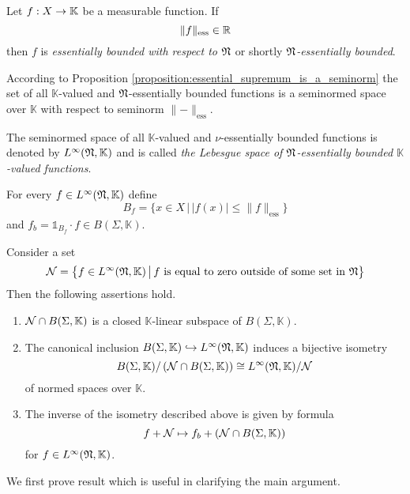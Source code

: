 \begin{definition}
    Let $f:X\rightarrow \mathbb{K}$ be a measurable function. If
    $$\lVert f \rVert_{\mathrm{ess}} \in {\mathbb R}$$
    then $f$ is \textit{essentially bounded with respect to ${\mathfrak N}$} or shortly \textit{${\mathfrak N}$-essentially bounded}.
\end{definition}
\noindent
According to Proposition \ref{proposition:essential_supremum_is_a_seminorm} the set of all $\mathbb{K}$-valued and ${\mathfrak N}$-essentially bounded functions is a seminormed space over $\mathbb{K}$ with respect to seminorm $\lVert-\rVert_{\mathrm{ess}}$.

\begin{definition}
    The seminormed space of all $\mathbb{K}$-valued and $\nu$-essentially bounded functions is denoted by $L^{\infty}({\mathfrak N},\mathbb{K})$ and is called \textit{the Lebesgue space of ${\mathfrak N}$-essentially bounded $\mathbb{K}$-valued functions}.
\end{definition}
\noindent
For every $f \in L^{\infty}({\mathfrak N},\mathbb{K})$ define
$$B_f = \big\{x \in X\,\big|\,|f(x)| \leq \lVert f \rVert_{\mathrm{ess}}\big\}$$
and $f_b = \mathbb{1}_{B_f}\cdot f \in B(\Sigma,\mathbb{K})$.

\begin{theorem}\label{theorem:canonical_isometry_of_quotients}
    Consider a set
    $${\mathcal N} = \big\{f\in L^{\infty}({\mathfrak N},\mathbb{K})\,\big|\,f\mbox{ is equal to zero outside of some set in }{\mathfrak N}\big\}$$
    Then the following assertions hold.
    \begin{enumerate}[label=\emph{\textbf{(\arabic*)}}, leftmargin=*]
        \item ${\mathcal N}\cap B(\Sigma,\mathbb{K})$ is a closed $\mathbb{K}$-linear subspace of $B(\Sigma, \mathbb{K})$.
        \item The canonical inclusion $B(\Sigma, \mathbb{K})\hookrightarrow L^{\infty}({\mathfrak N},\mathbb{K})$ induces a bijective isometry
              $$B(\Sigma,\mathbb{K})/\left({\mathcal N}\cap B(\Sigma,\mathbb{K})\right) \cong L^{\infty}({\mathfrak N},\mathbb{K})/{\mathcal N}$$
              of normed spaces over $\mathbb{K}$.
        \item The inverse of the isometry described above is given by formula
              $$f + {\mathcal N} \mapsto f_b + \left({\mathcal N} \cap B(\Sigma, \mathbb{K})\right)$$
              for $f \in L^{\infty}({\mathfrak N},\mathbb{K})$.
    \end{enumerate}
\end{theorem}
\noindent
We first prove result which is useful in clarifying the main argument.

